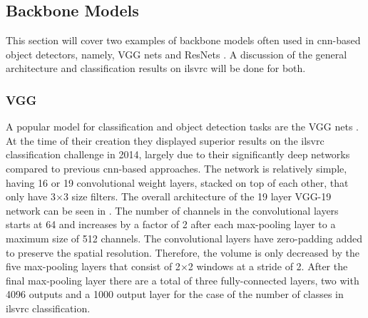 \subsection{Backbone Models}
This section will cover two examples of backbone models often used in \gls{cnn}-based object detectors, namely, VGG nets \cite{vgg16} and ResNets \cite{deepres}. A discussion of the general architecture and classification results on \gls{ilsvrc} will be done for both.

\subsubsection{VGG}
A popular model for classification and object detection tasks are the VGG nets \cite{vgg16}. At the time of their creation they displayed superior results on the \gls{ilsvrc} classification challenge in 2014, largely due to their significantly deep networks compared to previous \gls{cnn}-based approaches. The network is relatively simple, having 16 or 19 convolutional weight layers, stacked on top of each other, that only have 3$\times$3 size filters. The overall architecture of the 19 layer VGG-19 network can be seen in . The number of channels in the convolutional layers starts at 64 and increases by a factor of 2 after each max-pooling layer to a maximum size of 512 channels. The convolutional layers have zero-padding added to preserve the spatial resolution. Therefore, the volume is only decreased by the five max-pooling layers that consist of 2$\times$2 windows at a stride of 2. After the final max-pooling layer there are a total of three fully-connected layers, two with 4096 outputs and a 1000 output layer for the case of the number of classes in \gls{ilsvrc} classification.

